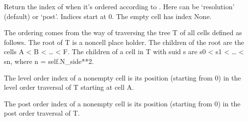 \documentclass[a4paper,12ptopenany,oneside,english]{sphinxmanual}
\begin{document}
\begin{fulllineitems}
\begin{fulllineitems}
\begin{sphinxVerbatim}[commandchars=\\\{\}]
  
 \PYG{p}{[} \PYG{p}{]}
 \PYG{p}{[} \PYG{p}{]}
\end{sphinxVerbatim}

\end{fulllineitems}


\begin{fulllineitems}
\label{\detokenize{dggs:rhealpixdggs.dggs.Cell.index}}
\pysigstartsignatures
{}
\pysigstopsignatures
\sphinxAtStartPar
Return the index of  when it’s ordered according to .
Here  can be ‘resolution’ (default) or ‘post’.
Indices start at 0.
The empty cell has index None.

\sphinxAtStartPar
The ordering comes from the way of traversing the tree T
of all cells defined as follows.
The root of T is a non\sphinxhyphen{}cell place holder.
The children of the root are the cells A \textless{} B \textless{} … \textless{} F.
The children of a cell in T with suid s are s0 \textless{} s1 \textless{} … \textless{} sn,
where n = self.N\_side**2.

\sphinxAtStartPar
The level order index of a nonempty cell is its position
(starting from 0) in the level order traversal of T starting at cell A.

\sphinxAtStartPar
The post order index of a nonempty cell is its position
(starting from 0) in the post order traversal of T.


\end{fulllineitems}
\end{fulllineitems}
\end{document}
